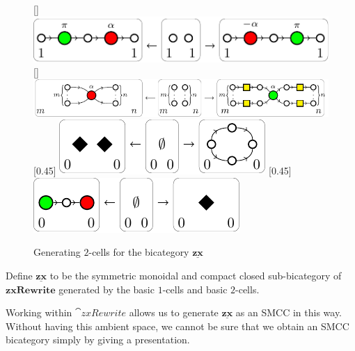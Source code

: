\documentclass[./1--Catfying_zxCalc--Master.tex]{subfiles} %
\begin{document}
\begin{figure}[h]
{\begin{minipage}{\textwidth}
{			}
			\linebreak
			[\textwidth]{%
				\includegraphics[scale=0.75]{InclGrphx--2cell--pi_commutation}
			}
			\linebreak
			[\textwidth]{%
				\includegraphics[scale=0.75]{InclGrphx--2cell--color_change}
			}
			\linebreak
			[0.45\textwidth]{%
				\includegraphics[scale=0.75]{InclGrphx--2cell--loop}
			}
			[0.45\textwidth]{%
				\includegraphics[scale=0.75]{InclGrphx--2cell--diamond}
			}
		\end{minipage}
	}
	\caption{Generating $2$-cells for the bicategory $\underline{\mathbf{zx}}$}
	\label{fig:ZX 2cells generators}
\end{figure}

\begin{defn}
	\label{def:zx bicat}
	Define $\underline{\mathbf{zx}}$ to be 
	the symmetric monoidal and 
	compact closed sub-bicategory 
	of $\mathbf{zxRewrite}$ generated by 
	the basic $1$-cells and basic $2$-cells.
\end{defn}

Working within $\cat{zxRewrite}$
allows us to generate 
$\underline{\mathbf{zx}}$
as an SMCC in this way.
Without having this ambient space,
we cannot be sure that we 
obtain an SMCC bicategory simply
by giving a presentation.
\end{document}
